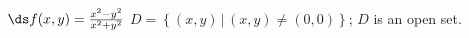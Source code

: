 {$\ds f(x,y) = \frac{x^2-y^2}{x^2+y^2}$}
{$D = \left\{(x,y)\, |\, (x,y)\neq (0,0) \right\}$; $D$ is an open set.
}